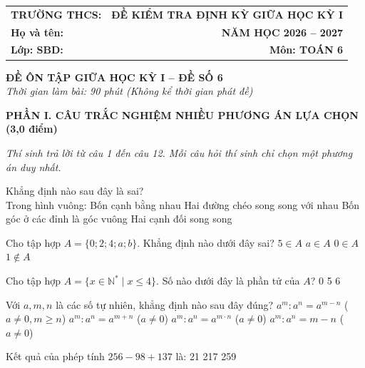 \documentclass[12pt,a4paper]{article}
\begin{document}
\noindent
\begin{tabularx}{\linewidth}{X r}
\textbf{TRƯỜNG THCS: \dotfill} & \textbf{ĐỀ KIỂM TRA ĐỊNH KỲ GIỮA HỌC KỲ I} \\
\textbf{Họ và tên: \dotfill} & \textbf{NĂM HỌC 2026 -- 2027} \\
\textbf{Lớp: \dotfill \quad SBD: \dotfill} & \textbf{Môn: TOÁN 6} \\
\hline
\end{tabularx}
\vspace{2mm}

\begin{center}
  \textbf{\large ĐỀ ÔN TẬP GIỮA HỌC KỲ I -- ĐỀ SỐ 6}\\
  \textit{Thời gian làm bài: 90 phút (Không kể thời gian phát đề)}
\end{center}
\vspace{1mm}

\noindent\textbf{\large PHẦN I. CÂU TRẮC NGHIỆM NHIỀU PHƯƠNG ÁN LỰA CHỌN (3,0 điểm)}

\textit{Thí sinh trả lời từ câu 1 đến câu 12. Mỗi câu hỏi thí sinh chỉ chọn một phương án duy nhất.}

\vspace{1mm}
\begin{ex}
Khẳng định nào sau đây là sai?\\Trong hình vuông:
\choice
{Bốn cạnh bằng nhau}
{\True Hai đường chéo song song với nhau}
{Bốn góc ở các đỉnh là góc vuông}
{Hai cạnh đối song song}
\end{ex}

\begin{ex}
Cho tập hợp $A = \{0; 2; 4; a; b\}$. Khẳng định nào dưới đây sai?
\choice
{\True $5 \in A$}
{$a \in A$}
{$0 \in A$}
{$1 \notin A$}
\end{ex}

\begin{ex}
Cho tập hợp $A = \{x \in \mathbb{N}^* \mid x \le 4\}$. Số nào dưới đây là phần tử của $A$?
\choice
{0}
{}
{5}
{6}
\end{ex}

\begin{ex}
Với $a, m, n$ là các số tự nhiên, khẳng định nào sau đây đúng?
\choice
{\True $a^m : a^n = a^{m-n}$ ($a \ne 0, m \ge n$)}
{$a^m : a^n = a^{m+n}$ ($a \ne 0$)}
{$a^m : a^n = a^{m \cdot n}$ ($a \ne 0$)}
{$a^m : a^n = m - n$ ($a \ne 0$)}
\end{ex}

\begin{ex}
Kết quả của phép tính $256 - 98 + 137$ là:
\choice
{21}
{217}
{259}
{}
\end{ex}
\end{document}
